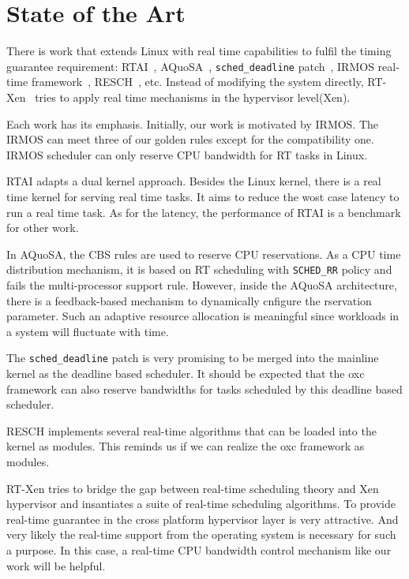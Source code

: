 \section{State of the Art}

There is work that extends Linux with real time capabilities to fulfil 
the timing guarantee requirement: RTAI~\cite{rtai}, AQuoSA~\cite{Luigi09}, 
\texttt{sched\_deadline} patch~\cite{Dario09}, 
IRMOS real-time framework~\cite{irmos}, RESCH~\cite{resch}, etc.
%
Instead of modifying the system directly, RT-Xen~\cite{rtxen} tries to 
apply real time mechanisms in the hypervisor level(Xen). 

Each work has its emphasis. Initially, our work is motivated by
IRMOS. The IRMOS can meet three of our golden rules except for 
the compatibility one. IRMOS scheduler can only reserve CPU 
bandwidth for RT tasks in Linux.  

RTAI adapts a dual kernel approach. Besides the Linux kernel, there is
a real time kernel for serving real time tasks. It aims to reduce the
wost case latency to run a real time task. As for the latency, the 
performance of RTAI is a benchmark for other work. 

In AQuoSA, the CBS rules are used to reserve CPU reservations. 
As a CPU time distribution mechanism, it is based on RT scheduling 
with \texttt{SCHED\_RR} policy and fails the multi-processor support 
rule. However, inside the AQuoSA architecture, there is a feedback-based 
mechanism to dynamically cnfigure the rservation parameter. Such an 
adaptive resource allocation is meaningful since workloads in a system 
will fluctuate with time. 

The \texttt{sched\_deadline} patch is very promising to be merged 
into the mainline kernel as the deadline based scheduler. 
It should be expected that the oxc framework can also reserve 
bandwidths for tasks scheduled by this deadline based scheduler. 

RESCH implements several real-time algorithms that can be
loaded into the kernel as modules. This reminds us if we can realize 
the oxc framework as modules. 

RT-Xen tries to bridge the gap between real-time scheduling theory and 
Xen hypervisor and insantiates a suite of real-time scheduling algorithms. 
To provide real-time guarantee in the cross platform hypervisor layer is 
very attractive. And very likely the real-time support from the operating 
system is necessary for such a purpose. In this case, a real-time CPU 
bandwidth control mechanism like our work will be helpful.

